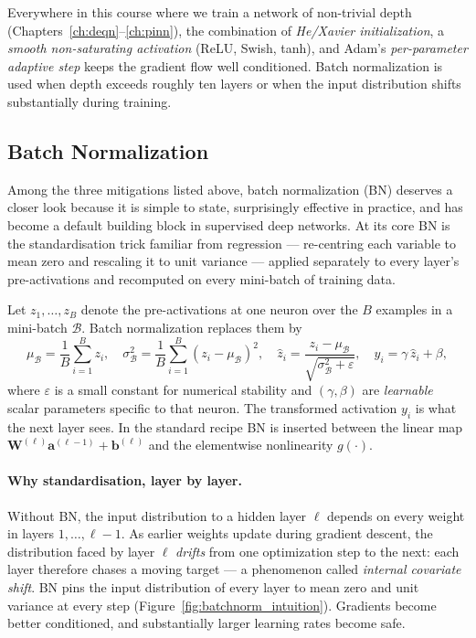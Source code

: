 \documentclass[11pt,a4paper]{report}
\newcommand{\W}{\bm{W}}
\begin{document}
\begin{keyinsightbox}
Everywhere in this course where we train a network of non-trivial depth (Chapters~\ref{ch:deqn}--\ref{ch:pinn}), the combination of \emph{He/Xavier initialization}, a \emph{smooth non-saturating activation} (ReLU, Swish, tanh), and Adam's \emph{per-parameter adaptive step} keeps the gradient flow well conditioned.  Batch normalization is used when depth exceeds roughly ten layers or when the input distribution shifts substantially during training.
\end{keyinsightbox}

\subsection{Batch Normalization}
\label{sec:batchnorm}

Among the three mitigations listed above, batch normalization \citep{ioffe2015batch} (BN) deserves a closer look because it is simple to state, surprisingly effective in practice, and has become a default building block in supervised deep networks.  At its core BN is the standardisation trick familiar from regression — re-centring each variable to mean zero and rescaling it to unit variance — applied separately to every layer's pre-activations and recomputed on every mini-batch of training data.

Let $z_1,\dots,z_B$ denote the pre-activations at one neuron over the $B$ examples in a mini-batch $\mathcal B$.  Batch normalization replaces them by
\begin{equation}
\mu_{\mathcal B} = \frac{1}{B}\sum_{i=1}^{B} z_i,
\quad
\sigma^2_{\mathcal B} = \frac{1}{B}\sum_{i=1}^{B} (z_i-\mu_{\mathcal B})^2,
\quad
\hat z_i = \frac{z_i-\mu_{\mathcal B}}{\sqrt{\sigma^2_{\mathcal B}+\varepsilon}},
\quad
y_i = \gamma\,\hat z_i + \beta,
\label{eq:batchnorm}
\end{equation}
where $\varepsilon$ is a small constant for numerical stability and $(\gamma,\beta)$ are \emph{learnable} scalar parameters specific to that neuron.  The transformed activation $y_i$ is what the next layer sees.  In the standard recipe BN is inserted between the linear map $\W^{(\ell)}\bm a^{(\ell-1)}+\bm b^{(\ell)}$ and the elementwise nonlinearity $g(\cdot)$.

\paragraph{Why standardisation, layer by layer.}  Without BN, the input distribution to a hidden layer $\ell$ depends on every weight in layers $1,\dots,\ell-1$.  As earlier weights update during gradient descent, the distribution faced by layer $\ell$ \emph{drifts} from one optimization step to the next: each layer therefore chases a moving target — a phenomenon \citet{ioffe2015batch} called \emph{internal covariate shift}.  BN pins the input distribution of every layer to mean zero and unit variance at every step (Figure~\ref{fig:batchnorm_intuition}).  Gradients become better conditioned, and substantially larger learning rates become safe.
\end{document}
